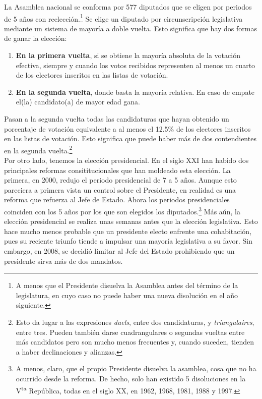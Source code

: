 La Asamblea nacional se conforma por 577 diputados que se eligen por periodos de 5 años con reelección.\footnote{A menos que el Presidente disuelva la Asamblea antes del término de la legislatura, en cuyo caso no puede haber una nueva disolución en el año siguiente.} Se elige un diputado por circunscripción legislativa mediante un sistema de mayoría a doble vuelta. Esto significa que hay dos formas de ganar la elección: 

\begin{enumerate}
\item \textbf{En la primera vuelta}, si se obtiene la mayoría absoluta de la votación efectiva, siempre y cuando los votos recibidos representen al menos un cuarto de los electores inscritos en las listas de votación. 
\item \textbf{En la segunda vuelta}, donde basta la mayoría relativa. En caso de empate el(la) candidato(a) de mayor edad gana. 
\end{enumerate}

Pasan a la segunda vuelta todas las candidaturas que hayan obtenido un porcentaje de votación equivalente a al menos el 12.5\% de los electores inscritos en las listas de votación. Esto significa que puede haber más de dos contendientes en la segunda vuelta.\footnote{Esto da lugar a las expresiones \textit{duels}, entre dos candidaturas, y \textit{triangulaires}, entre tres. Pueden también darse cuadrangulares o segundas vueltas entre más candidatos pero son mucho menos frecuentes y, cuando suceden, tienden a haber declinaciones y alianzas.}\\

Por otro lado, tenemos la elección presidencial. En el siglo XXI han habido dos principales reformas consititucionales que han moldeado esta elección. La primera, en 2000, redujo el periodo presidencial de 7 a 5 años. Aunque esto pareciera a primera vista un control sobre el Presidente, en realidad es una reforma que refuerza al Jefe de Estado. Ahora los periodos presidenciales coinciden con los 5 años por los que son elegidos los diputados.\footnote{A menos, claro, que el propio Presidente disuelva la asamblea, cosa que no ha ocurrido desde la reforma. De hecho, solo han existido 5 disoluciones en la V\textsuperscript{ta} República, todas en el siglo XX, en 1962, 1968, 1981, 1988 y 1997.} Más aún, la elección presidencial se realiza unas semanas antes que la elección legislativa. Esto hace mucho menos probable que un presidente electo enfrente una cohabitación, pues su reciente triunfo tiende a impulsar una mayoría legislativa a su favor. Sin embargo, en 2008, se decidió limitar al Jefe del Estado prohibiendo que un presidente sirva más de dos mandatos.\\

